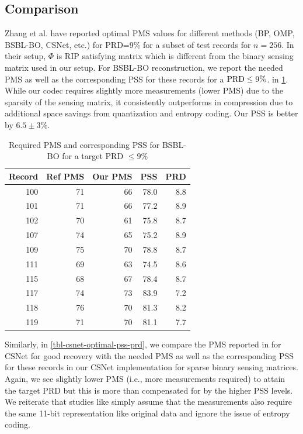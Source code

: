 \subsection{Comparison}
Zhang et al. \cite{zhang2021csnet} have reported
optimal PMS values for different methods (BP, OMP, BSBL-BO, CSNet, etc.)
for PRD=9\% for a subset of test records for $n=256$.
In their setup, $\Phi$ is RIP satisfying matrix which is different
from the binary sensing matrix used in our setup.
For BSBL-BO reconstruction,
we report the needed PMS as well as the corresponding PSS
for these records for a $\mathrm{PRD} \leq 9 \%$.
in \cref{tbl-bsbl-optimal-pss-prd}.
While our codec requires slightly more measurements (lower PMS)
due to the sparsity of the sensing matrix, it consistently
outperforms in compression due to additional space
savings from quantization and entropy coding.
Our PSS is better by $6.5 \pm 3\%$. 

\begin{table}[ht]
\centering
\caption{Required PMS and corresponding PSS for BSBL-BO for
a target PRD $\leq 9\%$}
\begin{tabular}{rrrrr}
\toprule
 Record &  Ref PMS &  Our PMS &  PSS &  PRD \\
\midrule
100 &         71 &   66 & 78.0 &  8.8 \\
101 &         71 &   66 & 77.2 &  8.9 \\
102 &         70 &   61 & 75.8 &  8.7 \\
107 &         74 &   65 & 75.2 &  8.9 \\
109 &         75 &   70 & 78.8 &  8.7 \\
111 &         69 &   63 & 74.5 &  8.6 \\
115 &         68 &   67 & 78.4 &  8.7 \\
117 &         74 &   73 & 83.9 &  7.2 \\
118 &         76 &   70 & 81.3 &  8.2 \\
119 &         71 &   70 & 81.1 &  7.7 \\
\bottomrule
\end{tabular}
\label{tbl-bsbl-optimal-pss-prd}
\end{table}


Similarly, in \cref{tbl-csnet-optimal-pss-prd},
we compare the PMS reported in \cite{zhang2021csnet}
for CSNet for good recovery with  
the needed PMS as well as the corresponding PSS
for these records in our CSNet implementation for
sparse binary sensing matrices.
Again, we see slightly lower PMS (i.e., more measurements
required) to attain the target PRD but this is more
than compensated for by the higher PSS levels.
We reiterate that studies like \cite{zhang2021csnet}
simply assume that the measurements also require the same
11-bit representation like original data and ignore
the issue of entropy coding.  

